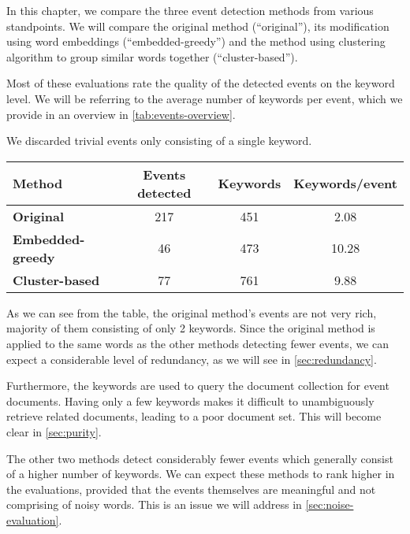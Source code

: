 In this chapter, we compare the three event detection methods from various standpoints. We will compare the original method (``original''), its modification using word embeddings (``embedded-greedy'') and the method using clustering algorithm to group similar words together (``cluster-based'').

Most of these evaluations rate the quality of the detected events on the keyword level. We will be referring to the average number of keywords per event, which we provide in an overview in \autoref{tab:events-overview}.

We discarded trivial events only consisting of a single keyword.

\hspace{\fill}

\begin{minipage}{\linewidth}
\centering
\begin{tabular}{ l c c c }\toprule[1.5pt]
\bf Method 	 & \bf Events detected & \bf Keywords & \bf Keywords/event \\ \midrule
\bf Original & 217 & 451 & 2.08 \\
\bf Embedded-greedy   & 46 & 473 & 10.28 \\
\bf Cluster-based & 77 & 761 & 9.88 \\ \bottomrule[1.25pt]
\end {tabular}\par
{} \label{tab:events-overview}
\end{minipage}

\hspace{\fill}

As we can see from the table, the original method's events are not very rich, majority of them consisting of only 2 keywords. Since the original method is applied to the same words as the other methods detecting fewer events, we can expect a considerable level of redundancy, as we will see in \autoref{sec:redundancy}.

Furthermore, the keywords are used to query the document collection for event documents. Having only a few keywords makes it difficult to unambiguously retrieve related documents, leading to a poor document set. This will become clear in \autoref{sec:purity}.

The other two methods detect considerably fewer events which generally consist of a higher number of keywords. We can expect these methods to rank higher in the evaluations, provided that the events themselves are meaningful and not comprising of noisy words. This is an issue we will address in \autoref{sec:noise-evaluation}.

